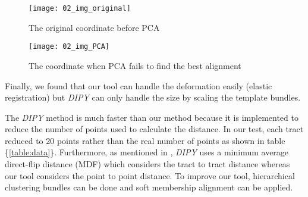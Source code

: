 \documentclass[../structure.tex]{subfiles}
\begin{document}
	\begin{figure}[h!]
	\centering
	\texttt{[image: 02\_img\_original]}
	\captionsetup{justification=centering}
	\caption{The original coordinate before PCA}
	\label{fig:all_brain}
	\end{figure}
	
	\begin{figure}[h!]
	\centering
	\texttt{[image: 02\_img\_PCA]}
	\captionsetup{justification=centering}
	\caption{The coordinate when PCA fails to find the best alignment}
	\label{fig:all_brain}
	\end{figure}
\pagebreak

Finally, we found that our tool can handle the deformation easily (elastic registration) but \textit{DIPY} can only handle the size by scaling the template bundles.

The \textit{DIPY} method is much faster than our method because it is implemented to reduce the number of points used to calculate the distance. In our test, each tract reduced to 20 points rather than the real number of points as shown in table \{\ref{table:data}\}. Furthermore, as mentioned in \cite{Garyfallidis2012}, \textit{DIPY} uses a minimum average direct-flip distance (MDF) which considers the tract to tract distance whereas our tool considers the point to point distance. To improve our tool, hierarchical clustering bundles can be done and soft membership alignment can be applied.
\end{document}
